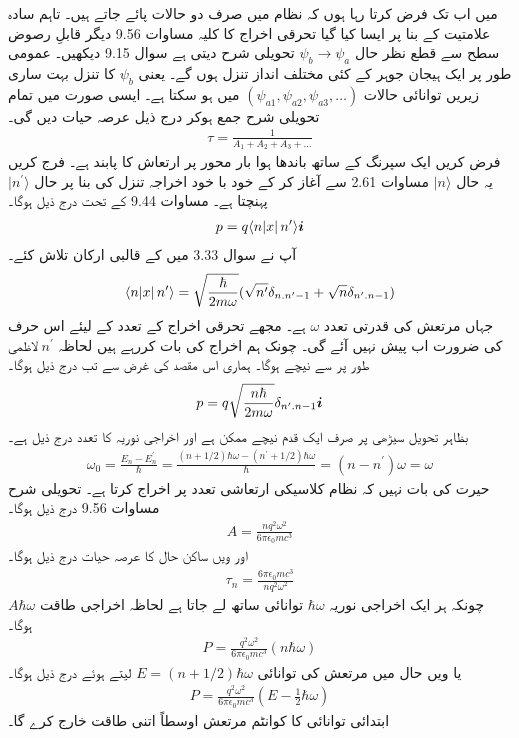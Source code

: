 میں اب تک فرض کرتا رہا ہوں کہ نظام میں صرف دو حالات پائے جاتے ہیں۔ تاہم سادہ علامتیت کے بنا پر ایسا کیا گیا تحرقی اخراج کا کلیہ مساوات \num{9.56} دیگر قابلِ رصوض سطح سے قطع نظر حال \(\psi_b \rightarrow \psi_a\) تحویلی شرح دیتی ہے سوال \num{9.15} دیکھیں۔ عمومی طور پر ایک ہیجان جوہر کے کئی مختلف انداز تنزل ہوں گے۔ یعنی \(\psi_b\) کا تنزل بہت ساری زیریں توانائی حالات \((\psi_{a1}, \psi_{a2}, \psi_{a3}, \dots)\) میں ہو سکتا ہے۔ ایسی صورت میں تمام تحویلی شرح جمع ہوکر درج ذیل عرصہ حیات دیں گی۔
\begin{align}
	\tau = \frac{1}{A_1+A_2+A_3+\dots}
\end{align}
فرض کریں ایک سپرنگ کے ساتھ باندھا ہوا بار  محور  پر ارتعاش کا پابند ہے۔ فرج کریں یہ حال \(\mid n \rangle\) مساوات \num{2.61} سے آغاز کر کے خود با خود اخراجہ تنزل کی بنا پر حال \(\mid n^\prime \rangle\) پہنچتا ہے۔ مساوات  \num{9.44} کے تحت درج ذیل ہوگا۔
\begin{align*}
	p = q\langle n\abs{x}n^\prime\rangle{\boldsymbol{i}}
\end{align*}
آپ نے سوال \num{3.33} میں  کے قالبی ارکان تلاش کئے۔
\begin{align*}
	\langle n\abs{x}n^\prime\rangle = \sqrt{\frac{\hbar}{2m\omega}}(\sqrt{n^\prime}\delta_{n.n^\prime-1}+\sqrt{n}\delta_{n^\prime.n-1})
\end{align*}
جہاں مرتعش کی قدرتی تعدد \(\omega\) ہے۔ مجھے تحرقی اخراج کے تعدد کے لیئے اس حرف کی ضرورت اب پیش نہیں آئے گی۔ چونک ہم اخراج کی بات کررہے ہیں لحاظہ \(n^\prime\) لاظمی طور پر  سے نیچے ہوگا۔ ہماری اس مقصد کی غرض سے تب درج ذیل ہوگا۔
\begin{align}
	p = q\sqrt{\frac{n\hbar}{2m\omega}}\delta_{n^\prime.n-1}{\boldsymbol{i}}
\end{align}
بظاہر تحویل سیڑھی پر صرف ایک قدم نیچے ممکن ہے اور اخراجی نوریہ کا تعدد درج ذیل ہے۔
\begin{align}
	\omega_0 = \frac{E_n-E_n^\prime}{\hbar} = \frac{(n+1/2)\hbar\omega - (n^\prime + 1/2)\hbar\omega}{\hbar} =(n-n^\prime)\omega = \omega
\end{align}
حیرت کی بات نہیں کہ نظام کلاسیکی ارتعاشی تعدد پر اخراج کرتا ہے۔ تحویلی شرح مساوات \num{9.56} درج ذیل ہوگا۔
\begin{align}
	A = \frac{nq^2\omega^2}{6\pi\epsilon_0mc^3}
\end{align}
اور ویں ساکن حال کا عرصہ حیات درج ذیل ہوگا۔
\begin{align}
	\tau_n = \frac{6\pi\epsilon_0mc^3}{nq^2\omega^2}
\end{align}
چونکہ ہر ایک اخراجی نوریہ \(\hbar\omega\) توانائی ساتھ لے جاتا ہے لحاظہ اخراجی طاقت \(A\hbar\omega\) ہوگا۔
\begin{align*}
	P = \frac{q^2\omega^2}{6\pi\epsilon_0mc^3}(n\hbar\omega)
\end{align*}
یا ویں حال میں مرتعش کی توانائی \(E = (n+1/2)\hbar\omega\) لیتے ہوئے درج ذیل ہوگا۔
\begin{align}
	P = \frac{q^2\omega^2}{6\pi\epsilon_0mc^3}(E-\frac{1}{2}\hbar\omega)
\end{align}
ابتدائی توانائی  کا کوانٹم مرتعش اوسطاً اتنی طاقت خارج کرے گا۔

